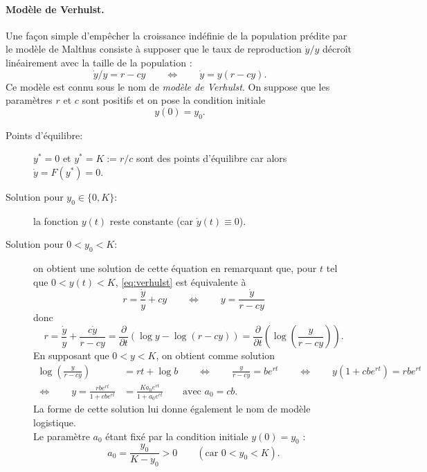 \paragraph*{Modèle de Verhulst.}
Une façon simple d'empêcher la croissance indéfinie de la population prédite par le modèle de Malthus consiste à supposer que le taux de reproduction $\dot y / y$ décroît linéairement avec la taille de la population : 
\begin{equation} \label{eq:verhulst}
\dot y / y = r - cy
\qquad \Leftrightarrow \qquad
\dot y = y(r - cy).
\end{equation}
Ce modèle est connu sous le nom de {\em modèle de Verhulst}. On suppose que les paramètres $r$ et $c$ sont positifs et on pose la condition initiale
$$
y(0) = y_0.
$$
\begin{description}
  \item[Points d'équilibre:] $y^* = 0$ et $y^* = K := r/c$ sont des points d'équilibre car alors $\dot y = F(y^*) = 0$.
  \item[Solution pour $y_0 \in \{0, K\}$:] la fonction $y(t)$ reste constante (car $\dot y(t) \equiv 0$).
  \item[Solution pour $0 < y_0 < K$:] on obtient une solution de cette équation en remarquant que, pour $t$ tel que $0 < y(t) < K$, \eqref{eq:verhulst} est équivalente à 
  $$
  r = \frac{\dot y}y + cy \qquad \Leftrightarrow \qquad y = \frac{\dot y}{r - cy}
  $$
  donc
  \begin{equation} \label{eq:verhulstSolution}
  r 
  = \frac{\dot y}{y} + \frac{c \dot y}{r - cy}
  = \frac{\partial}{\partial t} \left(\log y - \log (r - cy) \right)
  = \frac{\partial}{\partial t} \left(\log \left(\frac{y}{r - cy}\right)\right).
  \end{equation}
  En supposant que $0 < y < K$, on obtient comme solution 
  \begin{align*}
    \log \left(\frac{y}{r - cy}\right) & = rt + \log b
    \qquad \Leftrightarrow \qquad 
    \frac{y}{r - cy} = b e^{rt}
    \qquad \Leftrightarrow \qquad
    y(1 + c b e^{rt}) = r b e^{rt} \\
    \Leftrightarrow \qquad 
    y = \frac{rb e^{rt}}{1 + cb e^{rt}} & = \frac{K a_0 e^{rt}}{1 + a_0 e^{rt}}
    \qquad \text{avec } a_0 = cb.
  \end{align*}
  La forme de cette solution lui donne également le nom de modèle logistique. \\
  Le paramètre $a_0$ étant fixé par la condition initiale $y(0) = y_0$ : 
  $$
  a_0 = \frac{y_0}{K-y_0} > 0 \qquad (\text{car } 0  < y_0 < K).
$$
\end{description}
